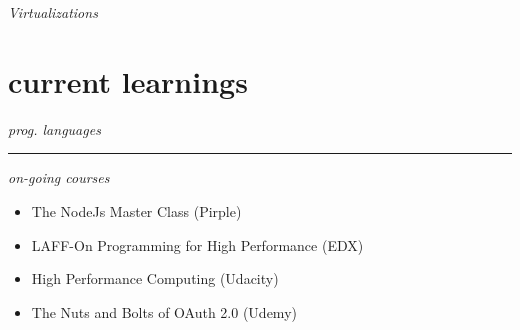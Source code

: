 \documentclass[12pt]{res}
\begin{document}
\begin{resume}
\begin{minipage}[t]{0.2\linewidth}
{		\begin{minipage}[t]{1.0\linewidth}
			\vspace{5pt}
			\raggedright{\emph{Virtualizations}}
		\end{minipage}
		\begin{minipage}[t]{1.0\linewidth}
			\vspace{5pt}
		\end{minipage}
	}
\end{minipage}
\hfill
\begin{minipage}[t]{0.35\linewidth}
	\section{current learnings}
	\footnotesize{		
		\begin{minipage}[t]{1.0\linewidth}
			\raggedright{\emph{prog. languages}}
		\end{minipage}
		\begin{minipage}[t]{1.0\linewidth}
			\vspace{5pt}
			\vspace{5pt}
		\end{minipage}
		\rule{1.0\textwidth}{0.1pt}

		\begin{minipage}[t]{0.5\linewidth}
			\vspace{5pt}
			\raggedright{\emph{on-going courses}}
		\end{minipage}
		\begin{minipage}[t]{1.0\linewidth}
			\vspace{5pt}
			\begin{flushleft}
				\begin{itemize}
					\item The NodeJs Master Class (Pirple)
					\item LAFF-On Programming for High Performance (EDX)
					\item High Performance Computing (Udacity)
					\item The Nuts and Bolts of OAuth 2.0 (Udemy)
				\end{itemize}
			\end{flushleft}
			\vspace{5pt}
		\end{minipage}
	}
\end{minipage}
\hfill
\begin{minipage}[t]{0.4\linewidth}

\end{minipage}
\end{resume}
\end{document}
